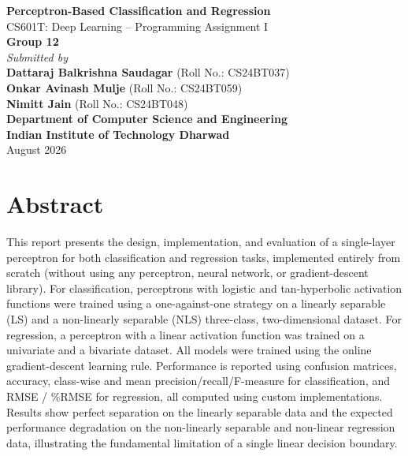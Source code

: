 \documentclass[11pt,a4paper]{article}
\begin{document}
\thispagestyle{empty}
\begin{center}
    \vspace*{1cm}
    {\LARGE \textbf{Perceptron-Based Classification and Regression}}\\[0.5cm]
    {\large CS601T: Deep Learning -- Programming Assignment I}\\[1.2cm]
    {\large \textbf{Group 12}}\\[0.7cm]
    {\itshape Submitted by}\\[0.3cm]
    {\large \textbf{Dattaraj Balkrishna Saudagar} (Roll No.: CS24BT037)}\\
    {\large \textbf{Onkar Avinash Mulje} (Roll No.: CS24BT059)}\\
    {\large \textbf{Nimitt Jain} (Roll No.: CS24BT048)}\\[1.2cm]
    {\large \textbf{Department of Computer Science and Engineering}}\\
    {\large \textbf{Indian Institute of Technology Dharwad}}\\[0.5cm]
    {\large August 2026}
\end{center}
\clearpage

\tableofcontents
\clearpage

\section*{Abstract}
This report presents the design, implementation, and evaluation of a single-layer perceptron for both classification and regression tasks, implemented entirely from scratch (without using any perceptron, neural network, or gradient-descent library). For classification, perceptrons with logistic and tan-hyperbolic activation functions were trained using a one-against-one strategy on a linearly separable (LS) and a non-linearly separable (NLS) three-class, two-dimensional dataset. For regression, a perceptron with a linear activation function was trained on a univariate and a bivariate dataset. All models were trained using the online gradient-descent learning rule. Performance is reported using confusion matrices, accuracy, class-wise and mean precision/recall/F-measure for classification, and RMSE / \%RMSE for regression, all computed using custom implementations. Results show perfect separation on the linearly separable data and the expected performance degradation on the non-linearly separable and non-linear regression data, illustrating the fundamental limitation of a single linear decision boundary.
\clearpage
\end{document}
